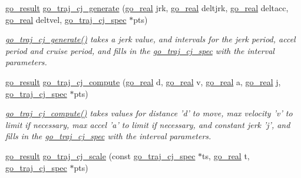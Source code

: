 \begin{DoxyCompactItemize}
\hyperlink{gotypes_8h_a55d48b38cd959f63c7e8db8337a9792a}{go\-\_\-result} \hyperlink{namespacegomotion_a6e56fd184b0ec5ce1668553a315c0ed7}{go\-\_\-traj\-\_\-cj\-\_\-generate} (\hyperlink{gotypes_8h_afd666a2393eebd71ee455846ac9def9b}{go\-\_\-real} jrk, \hyperlink{gotypes_8h_afd666a2393eebd71ee455846ac9def9b}{go\-\_\-real} deltjrk, \hyperlink{gotypes_8h_afd666a2393eebd71ee455846ac9def9b}{go\-\_\-real} deltacc, \hyperlink{gotypes_8h_afd666a2393eebd71ee455846ac9def9b}{go\-\_\-real} deltvel, \hyperlink{structgomotion_1_1go__traj__cj__spec}{go\-\_\-traj\-\_\-cj\-\_\-spec} $\ast$pts)
\begin{DoxyCompactList}\small\item\em \hyperlink{namespacegomotion_a6e56fd184b0ec5ce1668553a315c0ed7}{go\-\_\-traj\-\_\-cj\-\_\-generate()} takes a jerk value, and intervals for the jerk period, accel period and cruise period, and fills in the \hyperlink{structgomotion_1_1go__traj__cj__spec}{go\-\_\-traj\-\_\-cj\-\_\-spec} with the interval parameters. \end{DoxyCompactList}\item 
\hyperlink{gotypes_8h_a55d48b38cd959f63c7e8db8337a9792a}{go\-\_\-result} \hyperlink{namespacegomotion_a5edc6aa7aad4817534ac8099a2638610}{go\-\_\-traj\-\_\-cj\-\_\-compute} (\hyperlink{gotypes_8h_afd666a2393eebd71ee455846ac9def9b}{go\-\_\-real} d, \hyperlink{gotypes_8h_afd666a2393eebd71ee455846ac9def9b}{go\-\_\-real} v, \hyperlink{gotypes_8h_afd666a2393eebd71ee455846ac9def9b}{go\-\_\-real} a, \hyperlink{gotypes_8h_afd666a2393eebd71ee455846ac9def9b}{go\-\_\-real} j, \hyperlink{structgomotion_1_1go__traj__cj__spec}{go\-\_\-traj\-\_\-cj\-\_\-spec} $\ast$pts)
\begin{DoxyCompactList}\small\item\em \hyperlink{namespacegomotion_a5edc6aa7aad4817534ac8099a2638610}{go\-\_\-traj\-\_\-cj\-\_\-compute()} takes values for distance 'd' to move, max velocity 'v' to limit if necessary, max accel 'a' to limit if necessary, and constant jerk 'j', and fills in the \hyperlink{structgomotion_1_1go__traj__cj__spec}{go\-\_\-traj\-\_\-cj\-\_\-spec} with the interval parameters. \end{DoxyCompactList}\item 
\hyperlink{gotypes_8h_a55d48b38cd959f63c7e8db8337a9792a}{go\-\_\-result} \hyperlink{namespacegomotion_a6597fcefe873523be5a8a7a587788b53}{go\-\_\-traj\-\_\-cj\-\_\-scale} (const \hyperlink{structgomotion_1_1go__traj__cj__spec}{go\-\_\-traj\-\_\-cj\-\_\-spec} $\ast$ts, \hyperlink{gotypes_8h_afd666a2393eebd71ee455846ac9def9b}{go\-\_\-real} t, \hyperlink{structgomotion_1_1go__traj__cj__spec}{go\-\_\-traj\-\_\-cj\-\_\-spec} $\ast$pts)

\end{DoxyCompactItemize}
